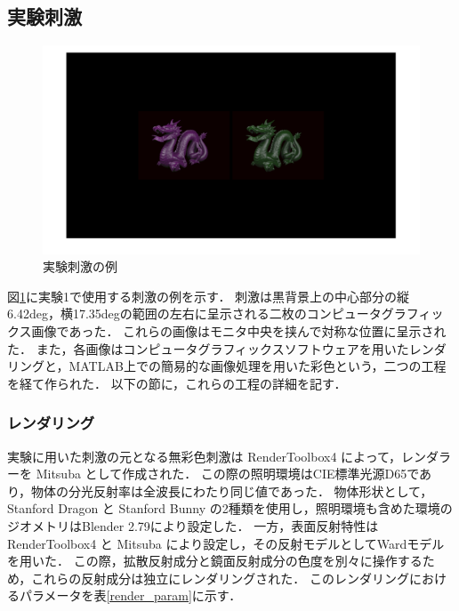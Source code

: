         \subsection{実験刺激}

            \begin{figure}[h]
                \centering
                \includegraphics[width=14.0cm]{./img/ex1_stimuli.png}
                \caption{実験刺激の例}
                \label{ex1_stimuli}
            \end{figure}

            図\ref{ex1_stimuli}に実験1で使用する刺激の例を示す．
            刺激は黒背景上の中心部分の縦6.42deg，横17.35degの範囲の左右に呈示される二枚のコンピュータグラフィックス画像であった．
            これらの画像はモニタ中央を挟んで対称な位置に呈示された．
            また，各画像はコンピュータグラフィックスソフトウェアを用いたレンダリングと，MATLAB上での簡易的な画像処理を用いた彩色という，二つの工程を経て作られた．
            以下の節に，これらの工程の詳細を記す．

            \subsubsection{レンダリング}
                実験に用いた刺激の元となる無彩色刺激は RenderToolbox4 によって，レンダラーを Mitsuba\cite{Mitsuba} として作成された．
                この際の照明環境はCIE標準光源D65であり，物体の分光反射率は全波長にわたり同じ値であった．
                物体形状として，Stanford Dragon と Stanford Bunny \cite{StanfordModels} の2種類を使用し，照明環境も含めた環境のジオメトリはBlender 2.79により設定した．
                一方，表面反射特性は RenderToolbox4 と Mitsuba により設定し，その反射モデルとしてWardモデル\cite{Ward}を用いた．
                この際，拡散反射成分と鏡面反射成分の色度を別々に操作するため，これらの反射成分は独立にレンダリングされた．
                このレンダリングにおけるパラメータを表\ref{render_param}に示す．

